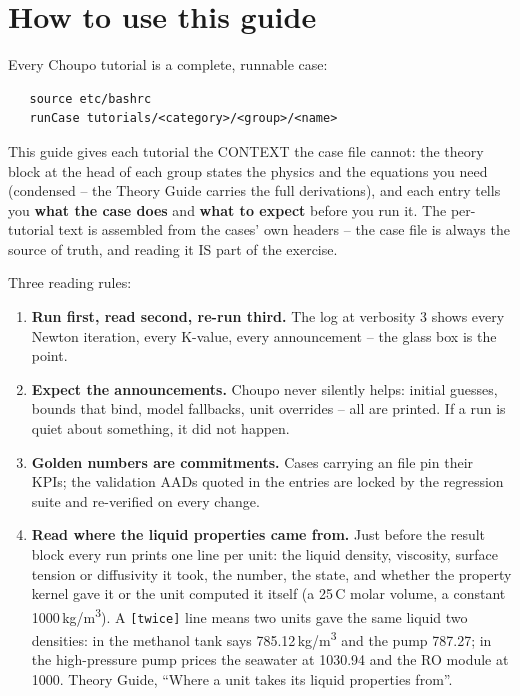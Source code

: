\documentclass[11pt,a4paper]{article}
\title{}
\author{}
\date{}
\begin{document}

{\small\setcounter{tocdepth}{3}\setcounter{secnumdepth}{0}\tableofcontents}
\clearpage

\section*{How to use this guide}

Every Choupo tutorial is a complete, runnable case:
\begin{verbatim}
   source etc/bashrc
   runCase tutorials/<category>/<group>/<name>
\end{verbatim}
This guide gives each tutorial the CONTEXT the case file cannot: the theory
block at the head of each group states the physics and the equations you
need (condensed -- the Theory Guide carries the full derivations), and each
entry tells you \textbf{what the case does} and \textbf{what to expect}
before you run it.  The per-tutorial text is assembled from the cases' own
headers -- the case file is always the source of truth, and reading it IS
part of the exercise.

Three reading rules:
\begin{enumerate}[leftmargin=*,nosep]
  \item \textbf{Run first, read second, re-run third.}  The log at
        verbosity 3 shows every Newton iteration, every K-value, every
        announcement -- the glass box is the point.
  \item \textbf{Expect the announcements.}  Choupo never silently helps:
        initial guesses, bounds that bind, model fallbacks, unit overrides
        -- all are printed.  If a run is quiet about something, it did not
        happen.
  \item \textbf{Golden numbers are commitments.}  Cases carrying an
         file pin their KPIs; the validation AADs quoted in
        the entries are locked by the regression suite and re-verified on
        every change.
  \item \textbf{Read where the liquid properties came from.}  Just before
        the result block every run prints one line per unit: the liquid
        density, viscosity, surface tension or diffusivity it took, the
        number, the state, and whether the property kernel gave it or the
        unit computed it itself (a 25\,\textdegree C molar volume, a
        constant 1000\,kg/m\textsuperscript{3}).  A \texttt{[twice]} line
        means two units gave the same liquid two densities: in
         the methanol tank says
        785.12\,kg/m\textsuperscript{3} and the pump 787.27; in
         the
        high-pressure pump prices the seawater at 1030.94 and the RO module at
        1000.  Theory Guide, ``Where a unit takes its liquid properties from''.
\end{enumerate}
\end{document}
